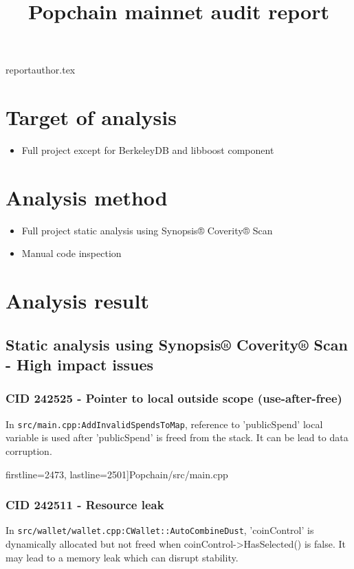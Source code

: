 \documentclass {article}
\begin{document}
\title {Popchain mainnet audit report}
 {reportauthor.tex}
\maketitle

\clearpage
\section{Target of analysis}

\begin{itemize}
\item Full project except for BerkeleyDB and libboost component
\end{itemize}

\section{Analysis method}

\begin{itemize}
\item Full project static analysis using Synopsis® Coverity® Scan
\item Manual code inspection
\end{itemize}

\section{Analysis result}
\subsection{Static analysis using Synopsis® Coverity® Scan - High impact issues}
\subsubsection{CID 242525 - Pointer to local outside scope (use-after-free)}
In \texttt{src/main.cpp:AddInvalidSpendsToMap}, reference to 'publicSpend' local variable
is used after 'publicSpend' is freed from the stack. It can be lead to data
corruption.

 firstline=2473, lastline=2501]{Popchain/src/main.cpp}

\subsubsection{CID 242511 - Resource leak}
In \texttt{src/wallet/wallet.cpp:CWallet::AutoCombineDust}, 'coinControl' is dynamically
allocated but not freed when coinControl->HasSelected() is false. It may lead to
a memory leak which can disrupt stability.
\end{document}
